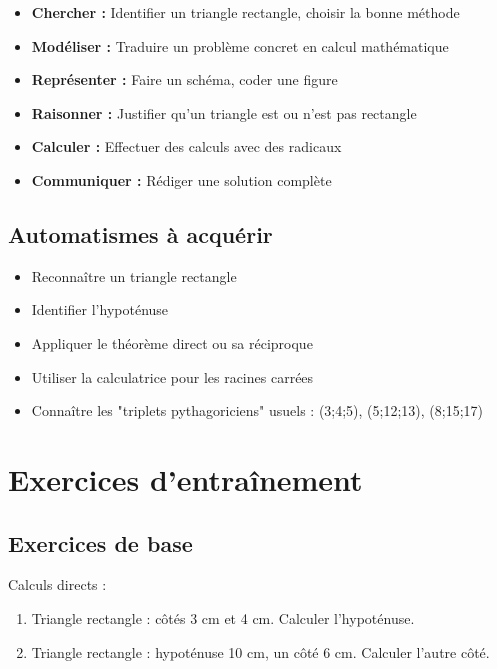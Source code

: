 \begin{itemize}
    \item \textbf{Chercher :} Identifier un triangle rectangle, choisir la bonne méthode
    \item \textbf{Modéliser :} Traduire un problème concret en calcul mathématique
    \item \textbf{Représenter :} Faire un schéma, coder une figure
    \item \textbf{Raisonner :} Justifier qu'un triangle est ou n'est pas rectangle
    \item \textbf{Calculer :} Effectuer des calculs avec des radicaux
    \item \textbf{Communiquer :} Rédiger une solution complète
\end{itemize}

\subsection{Automatismes à acquérir}

\begin{itemize}
    \item Reconnaître un triangle rectangle
    \item Identifier l'hypoténuse
    \item Appliquer le théorème direct ou sa réciproque
    \item Utiliser la calculatrice pour les racines carrées
    \item Connaître les "triplets pythagoriciens" usuels : (3;4;5), (5;12;13), (8;15;17)
\end{itemize}

\section{Exercices d'entraînement}

\subsection{Exercices de base}

\begin{exercisebox}
Calculs directs :
\begin{enumerate}[label=\alph*)]
    \item Triangle rectangle : côtés 3 cm et 4 cm. Calculer l'hypoténuse.
    \item Triangle rectangle : hypoténuse 10 cm, un côté 6 cm. Calculer l'autre côté.
\end{enumerate}
\end{exercisebox}

